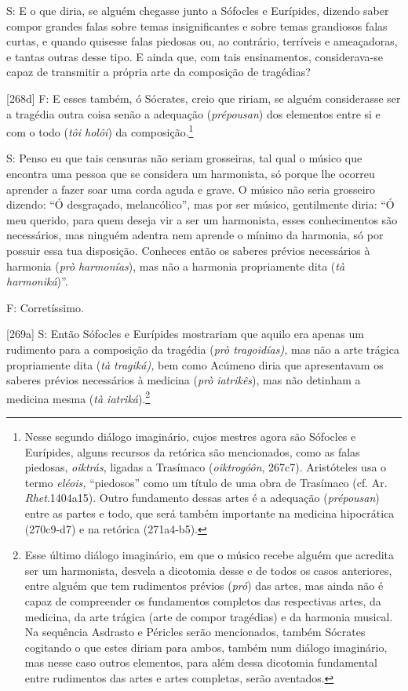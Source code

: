 S: E o que diria, se alguém chegasse junto a Sófocles e Eurípides,
dizendo saber compor grandes falas sobre temas insignificantes e sobre
temas grandiosos falas curtas, e quando quisesse falas piedosas ou, ao
contrário, terríveis e ameaçadoras, e tantas outras desse tipo. E ainda
que, com tais ensinamentos, considerava-se capaz de transmitir a própria
arte da composição de tragédias?

{[}268d{]} F: E esses também, ó Sócrates, creio que ririam, se alguém
considerasse ser a tragédia outra coisa senão a adequação
(\emph{prépousan}) dos elementos entre si e com o todo (\emph{tôi
holôi}) da composição.\footnote{Nesse segundo diálogo imaginário, cujos
  mestres agora são Sófocles e Eurípides, alguns recursos da retórica
  são mencionados, como as falas piedosas, \emph{oiktrás}, ligadas a
  Trasímaco (\emph{oiktrogóôn}, 267c7). Aristóteles usa o termo
  \emph{eléois,} ``piedosos'' como um título de uma obra de Trasímaco
  (cf. Ar. \emph{Rhet}.1404a15). Outro fundamento dessas artes é a
  adequação (\emph{prépousan}) entre as partes e todo, que será também
  importante na medicina hipocrática (270c9-d7) e na retórica
  (271a4-b5).}

S: Penso eu que tais censuras não seriam grosseiras, tal qual o músico
que encontra uma pessoa que se considera um harmonista, só porque lhe
ocorreu aprender a fazer soar uma corda aguda e grave. O músico não
seria grosseiro dizendo: ``Ó desgraçado, melancólico'', mas por ser
músico, gentilmente diria: ``Ó meu querido, para quem deseja vir a ser
um harmonista, esses conhecimentos são necessários, mas ninguém adentra
nem aprende o mínimo da harmonia, só por possuir essa tua disposição.
Conheces então os saberes prévios necessários à harmonia (\emph{prò}
\emph{harmonías}), mas não a harmonia propriamente dita (\emph{tà
harmoniká})''.

F: Corretíssimo.

{[}269a{]} S: Então Sófocles e Eurípides mostrariam que aquilo era
apenas um rudimento para a composição da tragédia (\emph{prò
tragoidías),} mas não a arte trágica propriamente dita (\emph{tà
tragiká),} bem como Acúmeno diria que apresentavam os saberes prévios
necessários à medicina (\emph{prò} \emph{iatrikês}), mas não detinham a
medicina mesma (\emph{tà iatriká}).\footnote{Esse último diálogo
  imaginário, em que o músico recebe alguém que acredita ser um
  harmonista, desvela a dicotomia desse e de todos os casos anteriores,
  entre alguém que tem rudimentos prévios (\emph{pró}) das artes, mas
  ainda não é capaz de compreender os fundamentos completos das
  respectivas artes, da medicina, da arte trágica (arte de compor
  tragédias) e da harmonia musical. Na sequência Asdrasto e Péricles
  serão mencionados, também Sócrates cogitando o que estes diriam para
  ambos, também num diálogo imaginário, mas nesse caso outros elementos,
  para além dessa dicotomia fundamental entre rudimentos das artes e
  artes completas, serão aventados.}

